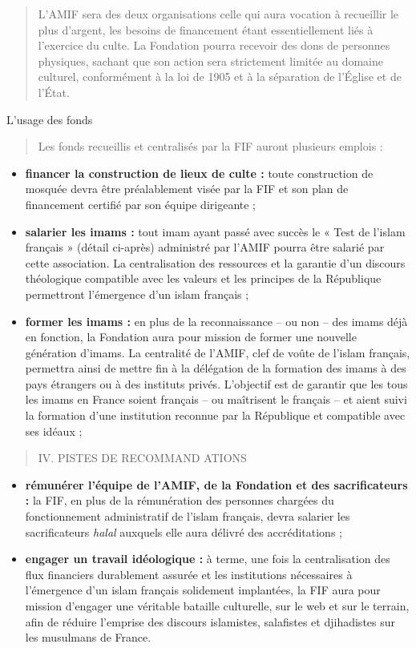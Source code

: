 \begin{quote}
L'AMIF sera des deux organisations celle qui aura vocation à recueillir
le plus d'argent, les besoins de financement étant essentiellement liés
à l'exercice du culte. La Fondation pourra recevoir des dons de
personnes physiques, sachant que son action sera strictement limitée au
domaine culturel, conformément à la loi de 1905 et à la séparation de
l'Église et de l'État.
\end{quote}

L'usage des fonds

\begin{quote}
Les fonds recueillis et centralisés par la FIF auront plusieurs emplois
:
\end{quote}

\begin{itemize}
\item
  \textbf{financer la construction de lieux de culte :} toute
  construction de mosquée devra être préalablement visée par la FIF et
  son plan de financement certifié par son équipe dirigeante ;
\item
  \textbf{salarier les imams :} tout imam ayant passé avec succès le «
  Test de l'islam français » (détail ci-après) administré par l'AMIF
  pourra être salarié par cette association. La centralisation des
  ressources et la garantie d'un discours théologique compatible avec
  les valeurs et les principes de la République permettront l'émergence
  d'un islam français ;
\item
  \textbf{former les imams :} en plus de la reconnaissance -- ou non --
  des imams déjà en fonction, la Fondation aura pour mission de former
  une nouvelle génération d'imams. La centralité de l'AMIF, clef de
  voûte de l'islam français, permettra ainsi de mettre fin à la
  délégation de la formation des imams à des pays étrangers ou à des
  instituts privés. L'objectif est de garantir que les tous les imams en
  France soient français -- ou maîtrisent le français -- et aient suivi
  la formation d'une institution reconnue par la République et
  compatible avec ses idéaux ;
\end{itemize}

\begin{quote}
IV. PISTES DE RECOMMAND ATIONS
\end{quote}

\begin{itemize}
\item
  \textbf{rémunérer l'équipe de l'AMIF, de la Fondation et des
  sacrificateurs :} la FIF, en plus de la rémunération des personnes
  chargées du fonctionnement administratif de l'islam français, devra
  salarier les sacrificateurs \emph{halal} auxquels elle aura délivré
  des accréditations ;
\item
  \textbf{engager un travail idéologique :} à terme, une fois la
  centralisation des flux financiers durablement assurée et les
  institutions nécessaires à l'émergence d'un islam français solidement
  implantées, la FIF aura pour mission d'engager une véritable bataille
  culturelle, sur le web et sur le terrain, afin de réduire l'emprise
  des discours islamistes, salafistes et djihadistes sur les musulmans
  de France.
\end{itemize}

